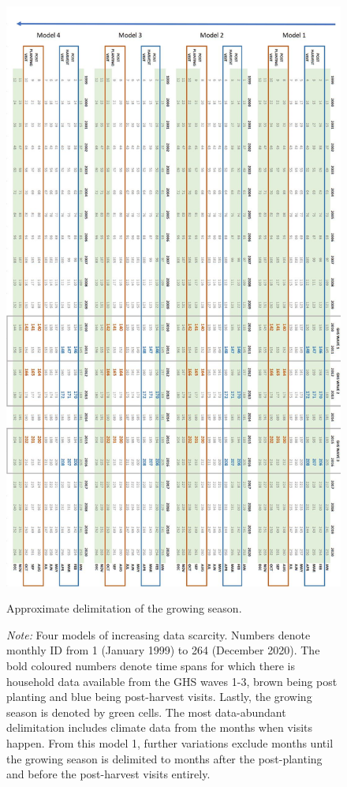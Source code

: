\documentclass[a4paper,12pt]{article}
\theoremstyle{plain}
\theoremstyle{definition}
\theoremstyle{definition}
\theoremstyle{definition}
\theoremstyle{definition}
\begin{document}
\begin{figure}
\centering
    \includegraphics[scale=0.58]{../outputs/timing.JPG}
    \caption{Approximate delimitation of the growing season.}
    \caption*{\footnotesize{\textit{Note:} Four models of increasing data scarcity. Numbers denote monthly ID from 1 (January 1999) to 264 (December 2020). The bold coloured numbers denote time spans for which there is household data available from the GHS waves 1-3, brown being post planting and blue being post-harvest visits. Lastly, the growing season is denoted by green cells. The most data-abundant delimitation includes climate data from the months when visits happen. From this model 1, further variations exclude months until the growing season is delimited to months after the post-planting and before the post-harvest visits entirely.}}
\label{fig:buffer}
\end{figure}
\end{document}
